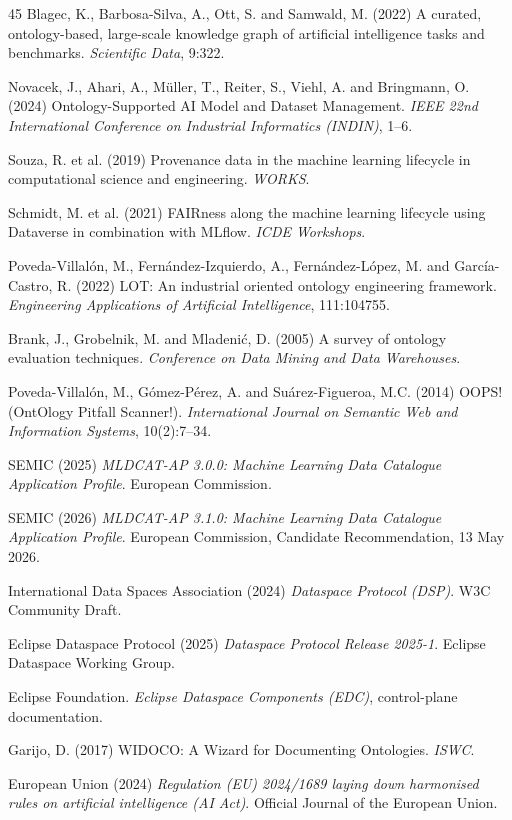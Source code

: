 \documentclass[Afour,sagev,times]{sagej}
\begin{document}
\begin{thebibliography}{45}
 Blagec, K., Barbosa-Silva, A., Ott, S. and Samwald, M. (2022) A curated, ontology-based, large-scale knowledge graph of artificial intelligence tasks and benchmarks. \emph{Scientific Data}, 9:322.

 Novacek, J., Ahari, A., M\"uller, T., Reiter, S., Viehl, A. and Bringmann, O. (2024) Ontology-Supported AI Model and Dataset Management. \emph{IEEE 22nd International Conference on Industrial Informatics (INDIN)}, 1--6.

 Souza, R. et al. (2019) Provenance data in the machine learning lifecycle in computational science and engineering. \emph{WORKS}.

 Schmidt, M. et al. (2021) FAIRness along the machine learning lifecycle using Dataverse in combination with MLflow. \emph{ICDE Workshops}.

 Poveda-Villalón, M., Fernández-Izquierdo, A., Fernández-López, M. and García-Castro, R. (2022) LOT: An industrial oriented ontology engineering framework. \emph{Engineering Applications of Artificial Intelligence}, 111:104755.

 Brank, J., Grobelnik, M. and Mladeni\'c, D. (2005) A survey of ontology evaluation techniques. \emph{Conference on Data Mining and Data Warehouses}.

 Poveda-Villalón, M., Gómez-Pérez, A. and Suárez-Figueroa, M.C. (2014) OOPS! (OntOlogy Pitfall Scanner!). \emph{International Journal on Semantic Web and Information Systems}, 10(2):7--34.

 SEMIC (2025) \emph{MLDCAT-AP 3.0.0: Machine Learning Data Catalogue Application Profile}. European Commission.

 SEMIC (2026) \emph{MLDCAT-AP 3.1.0: Machine Learning Data Catalogue Application Profile}. European Commission, Candidate Recommendation, 13 May 2026.

 International Data Spaces Association (2024) \emph{Dataspace Protocol (DSP)}. W3C Community Draft.

 Eclipse Dataspace Protocol (2025) \emph{Dataspace Protocol Release 2025-1}. Eclipse Dataspace Working Group.

 Eclipse Foundation. \emph{Eclipse Dataspace Components (EDC)}, control-plane documentation.

 Garijo, D. (2017) WIDOCO: A Wizard for Documenting Ontologies. \emph{ISWC}.

 European Union (2024) \emph{Regulation (EU) 2024/1689 laying down harmonised rules on artificial intelligence (AI Act)}. Official Journal of the European Union.

\end{thebibliography}
\end{document}
